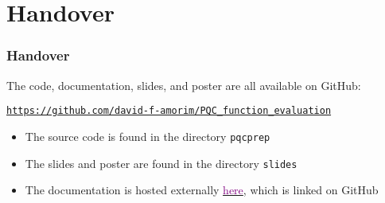 \documentclass{beamer}
\begin{document}
\section{Handover}

\begin{frame}

\frametitle{Handover}

The code, documentation, slides, and poster are all available on GitHub:
\begin{center}
\vspace{0.6cm}
\href{https://github.com/david-f-amorim/PQC_function_evaluation}{\texttt{https://github.com/david-f-amorim/PQC\_function\_evaluation}}
\vspace{0.6cm}
\end{center}

\begin{itemize}
\item The source code is found in the directory \alert{\texttt{pqcprep}} 
\item The slides and poster are found in the directory \alert{\texttt{slides}}
\item The documentation is hosted externally  \href{https://david-f-amorim.github.io/PQC_function_evaluation/pqcprep.html}{\textcolor{purple}{here}}, which is linked on GitHub
\end{itemize}

\end{frame}
\end{document}
